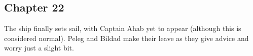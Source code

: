 \subsection{Chapter 22}

The ship finally sets sail, with Captain Ahab yet to appear (although this is
considered normal). Peleg and Bildad make their leave as they give advice and
worry just a slight bit.
